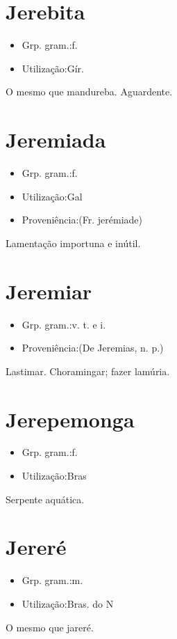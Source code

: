 \documentclass{article}
\begin{document}
\section{Jerebita}
\begin{itemize}
\item {Grp. gram.:f.}
\end{itemize}
\begin{itemize}
\item {Utilização:Gír.}
\end{itemize}
O mesmo que \textunderscore mandureba\textunderscore .
Aguardente.
\section{Jeremiada}
\begin{itemize}
\item {Grp. gram.:f.}
\end{itemize}
\begin{itemize}
\item {Utilização:Gal}
\end{itemize}
\begin{itemize}
\item {Proveniência:(Fr. \textunderscore jerémiade\textunderscore )}
\end{itemize}
Lamentação importuna e inútil.
\section{Jeremiar}
\begin{itemize}
\item {Grp. gram.:v. t.  e  i.}
\end{itemize}
\begin{itemize}
\item {Proveniência:(De \textunderscore Jeremias\textunderscore , n. p.)}
\end{itemize}
Lastimar.
Choramingar; fazer lamúria.
\section{Jerepemonga}
\begin{itemize}
\item {Grp. gram.:f.}
\end{itemize}
\begin{itemize}
\item {Utilização:Bras}
\end{itemize}
Serpente aquática.
\section{Jereré}
\begin{itemize}
\item {Grp. gram.:m.}
\end{itemize}
\begin{itemize}
\item {Utilização:Bras. do N}
\end{itemize}
O mesmo que \textunderscore jareré\textunderscore .
\end{document}
